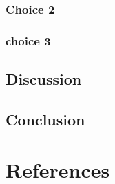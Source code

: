 \documentclass[letterpaper,10pt]{article}
\begin{document}
		\subsubsection{Choice 2}
		
		\subsubsection{choice 3}
		
	\subsection{Discussion}
	
	\subsection{Conclusion}
	
\section{References}
\end{document}
